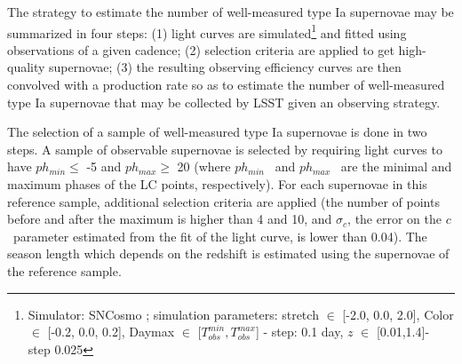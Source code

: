 \documentclass[a4paper,10pt]{article}
\newcommand{\sncolor}{$c$}
\newcommand{\phasemin}{$ph_{min}$}
\newcommand{\phasemax}{$ph_{max}$}
\begin{document}
The strategy to estimate the number of well-measured type Ia supernovae may be summarized in four steps: (1) light curves are simulated\footnote{Simulator: SNCosmo ; simulation parameters: stretch $\in$ [-2.0, 0.0, 2.0], Color $\in$ [-0.2, 0.0, 0.2], Daymax $\in$ [$T_{obs}^{min},T_{obs}^{max}$] - step: 0.1 day, $z$ $\in$ [0.01,1.4]- step 0.025} and fitted using observations of a given cadence; (2) selection criteria are applied to get high-quality supernovae; (3) the resulting observing efficiency curves are then convolved with a production rate \cite{perrett} so as to estimate the number of well-measured type Ia supernovae that may be collected by LSST given an observing strategy. 

 The selection of a sample of well-measured type Ia supernovae is done in two steps. A sample of observable supernovae is selected by requiring light curves to have \phasemin $\leq$ -5 and \phasemax $\geq$ 20 (where \phasemin~ and \phasemax~ are the minimal and maximum phases of the LC points, respectively). For each supernovae in this reference sample, additional selection criteria are applied (the number of points before and after the maximum is higher than 4 and 10, and $\sigma_c$, the error on the \sncolor~parameter estimated from the fit of the light curve, is lower than 0.04). The season length which depends on the redshift is estimated using the supernovae of the reference sample.
\end{document}
